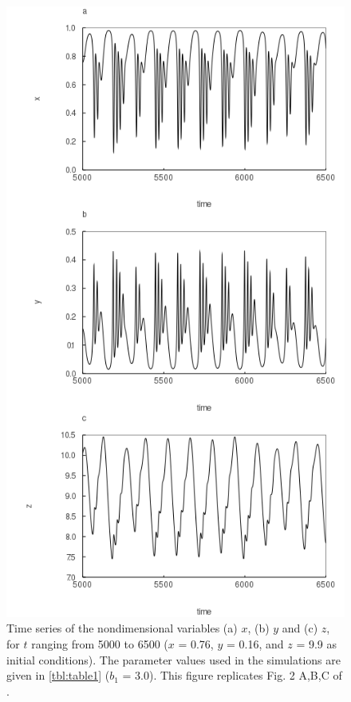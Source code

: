 \begin{figure}
  \centering
  \includegraphics[scale=0.7]{figures/fig2.png} \caption{Time series of the nondimensional variables (a) $x$, (b) $y$ and (c) $z$, for $t$ ranging from 5000 to 6500 ($x$ = 0.76, $y$ = 0.16, and $z$ = 9.9 as initial conditions). The parameter values used in the simulations are given in \autoref{tbl:table1} ($b_1$ = 3.0). This figure replicates Fig. 2 A,B,C of \citet{hastings1991}.}
  \label{fig:fig2}
\end{figure}


